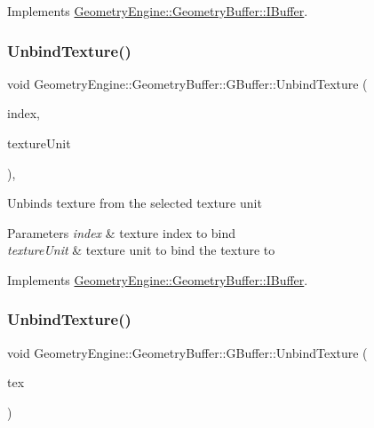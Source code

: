 Implements \mbox{\hyperlink{class_geometry_engine_1_1_geometry_buffer_1_1_i_buffer_a6130240d58d277cb9e897dfd1924613e}{Geometry\+Engine\+::\+Geometry\+Buffer\+::\+I\+Buffer}}.

\mbox{\label{class_geometry_engine_1_1_geometry_buffer_1_1_g_buffer_a1f02674c4ff24debb9f4b1b6d1243a9b}} 
\subsubsection{\texorpdfstring{UnbindTexture()}{UnbindTexture()}\hspace{0.1cm}{\footnotesize\ttfamily [2/4]}}
{\footnotesize\ttfamily void Geometry\+Engine\+::\+Geometry\+Buffer\+::\+G\+Buffer\+::\+Unbind\+Texture (\begin{DoxyParamCaption}\item[{unsigned int}]{index,  }\item[{unsigned int}]{texture\+Unit }\end{DoxyParamCaption})\hspace{0.3cm}{\ttfamily [override]}, {\ttfamily [virtual]}}

Unbinds texture from the selected texture unit 
\begin{DoxyParams}{Parameters}
{\em index} & texture index to bind \\
\hline
{\em texture\+Unit} & texture unit to bind the texture to \\
\hline
\end{DoxyParams}


Implements \mbox{\hyperlink{class_geometry_engine_1_1_geometry_buffer_1_1_i_buffer_a1136bf19a08f111e08648e66a8518b09}{Geometry\+Engine\+::\+Geometry\+Buffer\+::\+I\+Buffer}}.

\mbox{\label{class_geometry_engine_1_1_geometry_buffer_1_1_g_buffer_a15ffb63e72295abb6a10b2481fb878e4}} 
\subsubsection{\texorpdfstring{UnbindTexture()}{UnbindTexture()}\hspace{0.1cm}{\footnotesize\ttfamily [3/4]}}
{\footnotesize\ttfamily void Geometry\+Engine\+::\+Geometry\+Buffer\+::\+G\+Buffer\+::\+Unbind\+Texture (\begin{DoxyParamCaption}\item[{\mbox{\hyperlink{class_geometry_engine_1_1_geometry_buffer_1_1_g_buffer_a718dceafcac1915f7de061108597e1cc}{G\+B\+U\+F\+F\+E\+R\+\_\+\+T\+E\+X\+T\+U\+R\+E\+\_\+\+T\+Y\+PE}}}]{tex }\end{DoxyParamCaption})}

